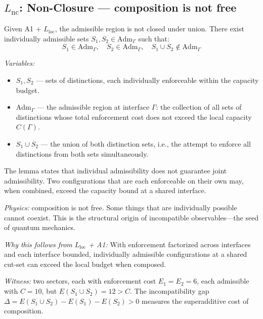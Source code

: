 \documentclass[11pt]{article}
\newcommand{\Adm}{\mathrm{Adm}}
\begin{document}
\subsection{\texorpdfstring{$L_{\mathrm{nc}}$}{Lnc}: Non-Closure --- composition is not free}

\begin{tcolorbox}[apfbox, title={Lemma $L_{\mathrm{nc}}$ (Non-Closure Under Composition)}]
Given A1 $+$ $L_{\mathrm{loc}}$, the admissible region is not closed under union.  There exist individually admissible sets $S_1, S_2 \in \Adm_\Gamma$ such that:
\begin{equation}
S_1 \in \Adm_\Gamma, \quad S_2 \in \Adm_\Gamma, \quad S_1 \cup S_2 \notin \Adm_\Gamma
\end{equation}

\smallskip\noindent\textit{Variables:}
\begin{itemize}[nosep,leftmargin=2em]
\item $S_1, S_2$ --- sets of distinctions, each individually enforceable within the capacity budget.
\item $\Adm_\Gamma$ --- the admissible region at interface $\Gamma$: the collection of all sets of distinctions whose total enforcement cost does not exceed the local capacity $C(\Gamma)$.
\item $S_1 \cup S_2$ --- the union of both distinction sets, i.e., the attempt to enforce all distinctions from both sets simultaneously.
\end{itemize}

\smallskip\noindent
The lemma states that individual admissibility does not guarantee joint admissibility.  Two configurations that are each enforceable on their own may, when combined, exceed the capacity bound at a shared interface.
\end{tcolorbox}

\textit{Physics:} composition is not free.  Some things that are individually possible cannot coexist.  This is the structural origin of incompatible observables---the seed of quantum mechanics.

\textit{Why this follows from $L_{\mathrm{loc}}$ + A1:} With enforcement factorized across interfaces and each interface bounded, individually admissible configurations at a shared cut-set can exceed the local budget when composed.

\textit{Witness:} two sectors, each with enforcement cost $E_1 = E_2 = 6$, each admissible with $C=10$, but $E(S_1 \cup S_2) = 12 > C$.  The incompatibility gap $\Delta = E(S_1 \cup S_2) - E(S_1) - E(S_2) > 0$ measures the superadditive cost of composition.
\end{document}
